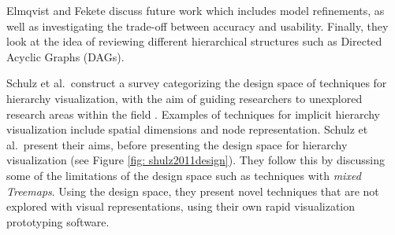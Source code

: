 %
%

Elmqvist and Fekete discuss future work which includes model refinements, as well as investigating the trade-off between accuracy and usability. Finally, they look at the idea of reviewing different hierarchical structures such as Directed Acyclic Graphs (DAGs).

Schulz et al.\ construct a survey categorizing the design space of techniques for hierarchy visualization, with the aim of guiding researchers to unexplored research areas within the field \cite{schulz2011design}. Examples of techniques for implicit hierarchy visualization include spatial dimensions and node representation.
Schulz et al.\ present their aims, before presenting the design space for hierarchy visualization (see Figure \ref{fig: shulz2011design}). They follow this by discussing some of the limitations of the design space such as techniques with \textit{mixed Treemaps}. Using the design space, they present novel techniques that are not explored with visual representations, using their own rapid visualization prototyping software.


